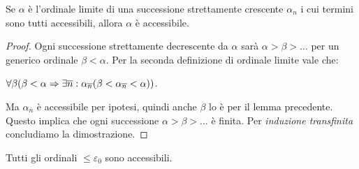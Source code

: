 	\begin{lemma}
		Se $\alpha$ è l'ordinale limite di una successione strettamente crescente $\alpha_{n}$ i cui termini sono tutti accessibili, allora $\alpha$ è accessibile.
	\end{lemma}	
	\begin{proof}
		Ogni successione strettamente decrescente da $\alpha$ sarà $\alpha>\beta>\ldots$ per un generico ordinale $\beta<\alpha$. Per la seconda definizione di ordinale limite vale che:
		\begin{center}
		$\forall\beta(\beta<\alpha\Rightarrow\exists\overline{n}:\alpha_{\overline{n}}(\beta<\alpha_{\overline{n}}<\alpha))$.
		\end{center}
		Ma $\alpha_{\overline{n}}$ è accessibile per ipotesi, quindi anche $\beta$ lo è per il lemma precedente. Questo implica che ogni successione $\alpha>\beta>\ldots$ è finita. Per \emph{induzione transfinita} concludiamo la dimostrazione.
	\end{proof}
	\begin{comment}
		\begin{equation}
			scrivi principio di induz transfinita \nonumber
		\end{equation}
	\end{comment}	
	\begin{teo}[di Accessibilità]
		Tutti gli ordinali $\leq \varepsilon_0$ sono accessibili.
	\end{teo}
